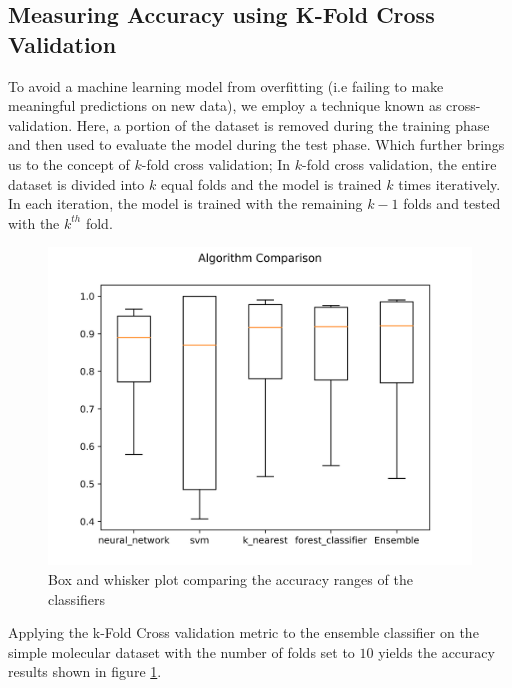\documentclass[a4paper,12pt]{report}
\begin{document}
		\subsection{Measuring Accuracy using K-Fold Cross Validation}
		To avoid a machine learning model from overfitting (i.e failing to make meaningful predictions on new data), we employ a technique known as cross-validation. Here, a portion of the dataset is removed during the training phase and then used to evaluate the model during the test phase. Which further brings us to the concept of $k$-fold cross validation; In $k$-fold cross validation, the entire dataset is divided into $k$ equal folds and the model is trained $k$ times iteratively. In each iteration, the model is trained with the remaining $k-1$ folds and tested with the $k^{th}$ fold.
			\begin{figure}[H]
				\centering
				\includegraphics[width=\textwidth,scale=1]{images/model_comparison}
				\caption{Box and whisker plot comparing the accuracy ranges of the classifiers}
				\label{fig:box_plot_comparison}
			\end{figure}
		Applying the k-Fold Cross validation metric to the ensemble classifier on the simple molecular dataset with the number of folds set to $10$ yields the accuracy results shown in figure \ref{fig:box_plot_comparison}.
		
\end{document}
